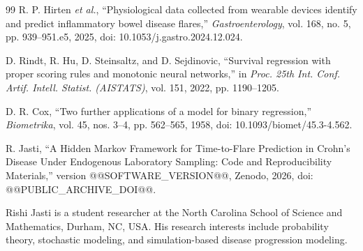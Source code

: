 \documentclass{ieeeaccess}
\begin{document}
\begin{thebibliography}{99}
 R. P. Hirten \emph{et al.}, ``Physiological data collected from wearable devices identify and predict inflammatory bowel disease flares,'' \emph{Gastroenterology}, vol. 168, no. 5, pp. 939--951.e5, 2025, doi: 10.1053/j.gastro.2024.12.024.

 D. Rindt, R. Hu, D. Steinsaltz, and D. Sejdinovic, ``Survival regression with proper scoring rules and monotonic neural networks,'' in \emph{Proc. 25th Int. Conf. Artif. Intell. Statist. (AISTATS)}, vol. 151, 2022, pp. 1190--1205.

 D. R. Cox, ``Two further applications of a model for binary regression,'' \emph{Biometrika}, vol. 45, nos. 3--4, pp. 562--565, 1958, doi: \mbox{10.1093/biomet/45.3-4.562}.

 R. Jasti, ``A Hidden Markov Framework for Time-to-Flare Prediction in Crohn's Disease Under Endogenous Laboratory Sampling: Code and Reproducibility Materials,'' version @@SOFTWARE_VERSION@@, Zenodo, 2026, doi: \mbox{@@PUBLIC_ARCHIVE_DOI@@}.

\end{thebibliography}

\begin{IEEEbiographynophoto}{Rishi Jasti}
is a student researcher at the North Carolina School of Science and Mathematics, Durham, NC, USA. His research interests include probability theory, stochastic modeling, and simulation-based disease progression modeling.
\end{IEEEbiographynophoto}

\EOD
\end{document}
